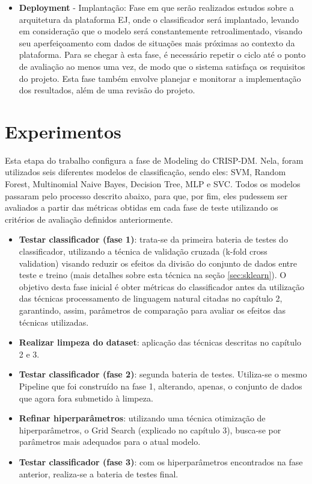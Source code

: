 \begin{itemize}
    \item \textbf{Deployment} - Implantação: Fase em que serão realizados estudos sobre a arquitetura da plataforma EJ, onde o classificador será implantado, levando em consideração que o modelo será constantemente retroalimentado, visando seu aperfeiçoamento com dados de situações mais próximas ao contexto da plataforma. Para se chegar à esta fase, é necessário repetir o ciclo até o ponto de avaliação ao menos uma vez, de modo que o sistema satisfaça os requisitos do projeto. Esta fase também envolve planejar e monitorar a implementação dos resultados, além de uma revisão do projeto.
\end{itemize}

\section{Experimentos}
\label{experimentos}

Esta etapa do trabalho configura a fase de Modeling do CRISP-DM. Nela, foram utilizados seis diferentes modelos de classificação, sendo eles: SVM, Random Forest, Multinomial Naive Bayes, Decision Tree, MLP e SVC. Todos os modelos passaram pelo processo descrito abaixo, para que, por fim, eles pudessem ser avaliados a partir das métricas obtidas em cada fase de teste utilizando os critérios de avaliação definidos anteriormente.

\begin{itemize}
    \item \textbf{Testar classificador (fase 1)}: trata-se da primeira bateria de testes do classificador, utilizando a técnica de validação cruzada (k-fold cross validation) visando reduzir os efeitos da divisão do conjunto de dados entre teste e treino (mais detalhes sobre esta técnica na seção \ref{sec:sklearn}). O objetivo desta fase inicial é obter métricas do classificador antes da utilização das técnicas processamento de linguagem natural citadas no capítulo 2, garantindo, assim, parâmetros de comparação para avaliar os efeitos das técnicas utilizadas. 
    \item \textbf{Realizar limpeza do dataset}: aplicação das técnicas descritas no capítulo 2 e 3.
    \item \textbf{Testar classificador (fase 2)}: segunda bateria de testes. Utiliza-se o mesmo Pipeline que foi construído na fase 1, alterando, apenas, o conjunto de dados que agora fora submetido à limpeza.
    \item \textbf{Refinar hiperparâmetros}: utilizando uma técnica otimização de hiperparâmetros, o Grid Search (explicado no capítulo 3), busca-se por parâmetros mais adequados para o atual modelo.
    \item \textbf{Testar classificador (fase 3)}: com os hiperparâmetros encontrados na fase anterior, realiza-se a bateria de testes final.
\end{itemize}


